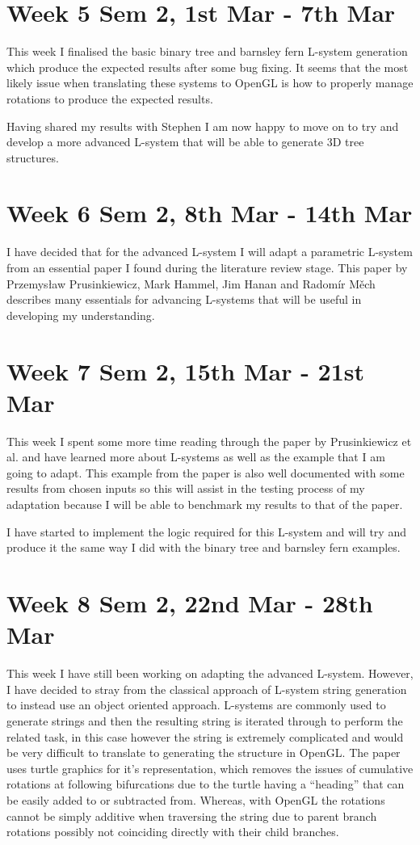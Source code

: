 \documentclass[11pt]{article}
\begin{document}
\section*{Week 5 Sem 2, 1st Mar - 7th Mar}
This week I finalised the basic binary tree and barnsley fern L-system generation which produce 
the expected results after some bug fixing. It seems that the most likely issue when translating 
these systems to OpenGL is how to properly manage rotations to produce the expected results. 

Having shared my results with Stephen I am now happy to move on to try and develop a more advanced 
L-system that will be able to generate 3D tree structures.

\section*{Week 6 Sem 2, 8th Mar - 14th Mar}
I have decided that for the advanced L-system I will adapt a parametric L-system from an essential 
paper I found during the literature review stage. This paper by Przemys\l{}aw Prusinkiewicz, 
Mark Hammel, Jim Hanan and Radom\'{i}r M\v{e}ch describes many essentials for advancing L-systems 
that will be useful in developing my understanding.

\section*{Week 7 Sem 2, 15th Mar - 21st Mar}
This week I spent some more time reading through the paper by Prusinkiewicz et al. and have learned 
more about L-systems as well as the example that I am going to adapt. This example from the paper 
is also well documented with some results from chosen inputs so this will assist in the testing 
process of my adaptation because I will be able to benchmark my results to that of the paper.

I have started to implement the logic required for this L-system and will try and produce it the 
same way I did with the binary tree and barnsley fern examples.

\section*{Week 8 Sem 2, 22nd Mar - 28th Mar}
This week I have still been working on adapting the advanced L-system. However, I have decided 
to stray from the classical approach of L-system string generation to instead use an object 
oriented approach. L-systems are commonly used to generate strings and then the resulting string 
is iterated through to perform the related task, in this case however the string is extremely 
complicated and would be very difficult to translate to generating the structure in OpenGL. 
The paper uses turtle graphics for it's representation, which removes the issues of cumulative 
rotations at following bifurcations due to the turtle having a ``heading'' that can be easily 
added to or subtracted from. Whereas, with OpenGL the rotations cannot be simply additive when 
traversing the string due to parent branch rotations possibly not coinciding directly with their 
child branches.
\end{document}
